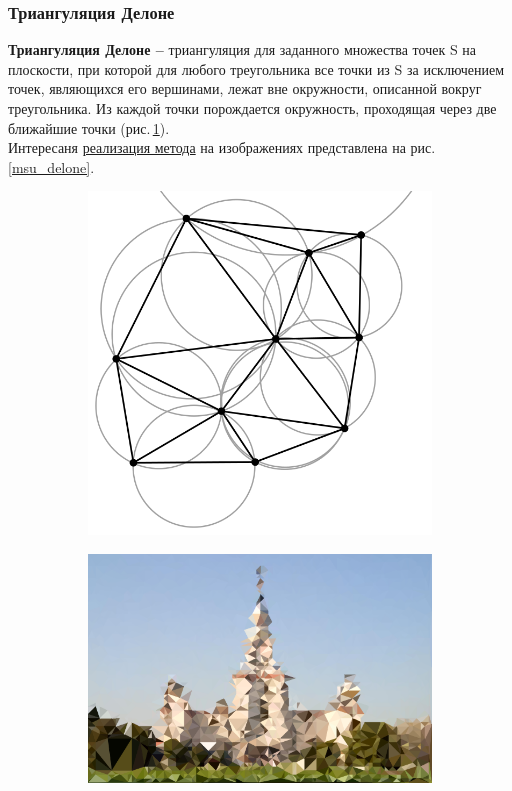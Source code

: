 \documentclass[11pt,a4paper]{extarticle}
\begin{document}
			\subsubsection{Триангуляция Делоне} 
				\textbf{Триангуляция Делоне --} триангуляция для заданного множества точек S на плоскости, при которой для любого треугольника все точки из S за исключением точек, являющихся его вершинами, лежат вне окружности, описанной вокруг треугольника.
				Из каждой точки порождается окружность, проходящая через две ближайшие точки (рис.\,\ref{delone}).\\
				Интересаня \href{https://github.com/snorpey/triangulate-image}{реализация метода} на изображениях представлена на рис. \ref{msu_delone}. \cite{img_delone}
				\begin{figure}[ht]
					\centering
					\begin{subfigure}[ht]{2in}
						\includegraphics[width=\textwidth]{delone}	
						\caption{}
						\label{delone}	
					\end{subfigure}
					\begin{subfigure}[ht]{3in}
						\includegraphics[width=\textwidth]{msu_delone}	

\end{subfigure}
\end{figure}
\end{document}
